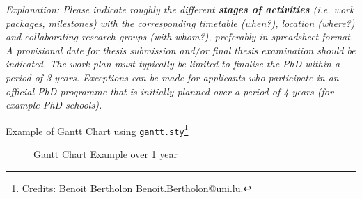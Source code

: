 % 
% 

\emph{Explanation:
  Please indicate roughly the different \textbf{stages of activities} (i.e. work
  packages, milestones) with the corresponding timetable (when?), location
  (where?) and collaborating research groups (with whom?), preferably in
  spreadsheet format. A provisional date for thesis submission and/or final
  thesis examination should be indicated. 	
  The work plan must typically be limited to finalise the PhD within a period of
  3 years. Exceptions can be made for applicants who participate in an official
  PhD programme that is initially planned over a period of 4 years (for example
  PhD schools). 
}



Example of Gantt Chart using \texttt{gantt.sty}\footnote{Credits: Benoit
  Bertholon \url{Benoit.Bertholon@uni.lu}.}

\begin{figure}[H]
    \hspace{-5em}
    \begin{gantt}{7}{12}
        \begin{ganttitle}
        \end{ganttitle}

    \end{gantt}
    \caption{Gantt Chart Example over 1 year}
    \label{fig:timeline}

\end{figure}



% 

